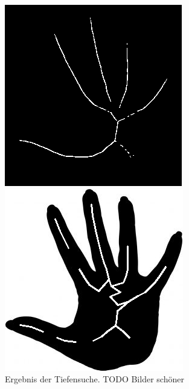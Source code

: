 \begin{figure}[htbp]
	\centering
	\begin{minipage}{5cm}
		\centering
		\includegraphics[width=1.0\linewidth]{./fig/hand-skelett}
	\end{minipage}
	\hspace{2cm}
	\begin{minipage}{5cm}
		\centering
		\includegraphics[width=1.0\linewidth]{./fig/hand-dfs}
	\end{minipage}
	\caption{Ergebnis der Tiefensuche. TODO Bilder schöner}
	\label{fig:hand_DFS}
	\end{figure}\\
